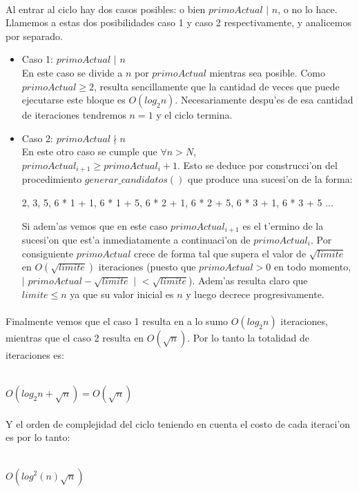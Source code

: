 \paragraph{}
Al entrar al ciclo hay dos casos posibles: o bien $primoActual$ $|$ $n$, o no lo hace. Llamemos a estas dos
posibilidades caso 1 y caso 2 respectivamente, y analicemos por separado.
\begin{itemize}
\item Caso 1: $primoActual$ $|$ $n$ \\
En este caso se divide a $n$ por $primoActual$ mientras sea posible. Como $primoActual \geq 2$, resulta
sencillamente que la cantidad de veces que puede ejecutarse este bloque es $O(log_2 n)$. Necesariamente
despu'es de esa cantidad de iteraciones tendremos $n = 1$ y el ciclo termina.
\item Caso 2: $primoActual \nmid n$\\
En este otro caso se cumple que $\forall n > N$, $primoActual_{i+1} \geq primoActual_i + 1$. Esto se deduce
por construcci'on del procedimiento $generar\_candidatos()$ que produce una sucesi'on de la forma: \\

\centerline{2, 3, 5, 6 * 1 + 1, 6 * 1 + 5, 6 * 2 + 1, 6 * 2 + 5, 6 * 3 + 1, 6 * 3 + 5 ...} 

Si adem'as vemos que en este caso $primoActual_{i+1}$ es el t'ermino de la sucesi'on que est'a 
inmediatamente a continuaci'on de $primoActual_i$. Por consiguiente $primoActual$ crece
de forma tal que supera el valor de $\sqrt{limite}$ en $O(\sqrt{limite})$ iteraciones (puesto
que $primoActual > 0$ en todo momento, $|$ $primoActual - \sqrt{limite}$ $|$ $< \sqrt{limite}$).
Adem'as resulta claro que $limite \leq n$ ya que su valor inicial es $n$ y luego decrece
progresivamente.
\end{itemize}

\paragraph{}
Finalmente vemos que el caso 1 resulta en a lo sumo $O(log_2 n)$ iteraciones, mientras que
el caso 2 resulta en $O(\sqrt{n})$. Por lo tanto la totalidad de iteraciones es:\\
\\
\centerline{$O(log_2 n + \sqrt{n}) = O(\sqrt{n})$}
\paragraph{}
Y el orden de complejidad del ciclo teniendo en cuenta el costo de cada iteraci'on es por lo tanto:\\
\\
\centerline{$O(log^2 (n) \sqrt{n})$}
